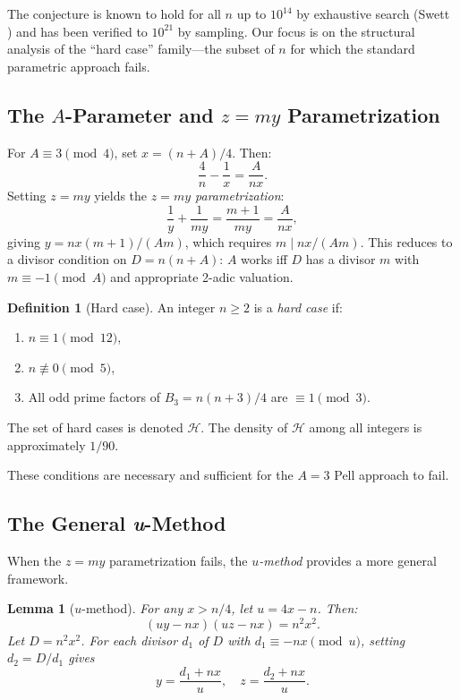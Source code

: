 \documentclass[11pt,a4paper]{article}
\theoremstyle{plain}
\newtheorem{lemma}[theorem]{Lemma}
\theoremstyle{definition}
\newtheorem{definition}[theorem]{Definition}
\newcommand{\Hard}{\mathcal{H}}
\begin{document}
The conjecture is known to hold for all $n$ up to $10^{14}$ by exhaustive search (Swett \cite{swett2006}) and has been verified to $10^{21}$ by sampling. Our focus is on the structural analysis of the ``hard case'' family---the subset of $n$ for which the standard parametric approach fails.

\subsection{The $A$-Parameter and $z = my$ Parametrization}

For $A \equiv 3 \pmod{4}$, set $x = (n+A)/4$. Then:
\[
\frac{4}{n} - \frac{1}{x} = \frac{A}{nx}.
\]
Setting $z = my$ yields the \emph{$z = my$ parametrization}:
\[
\frac{1}{y} + \frac{1}{my} = \frac{m+1}{my} = \frac{A}{nx},
\]
giving $y = nx(m+1)/(Am)$, which requires $m \mid nx/(Am)$. This reduces to a divisor condition on $D = n(n+A)$: $A$ works iff $D$ has a divisor $m$ with $m \equiv -1 \pmod{A}$ and appropriate 2-adic valuation.

\begin{definition}[Hard case]
\label{def:hard}
An integer $n \geq 2$ is a \emph{hard case} if:
\begin{enumerate}[label=(\roman*)]
\item $n \equiv 1 \pmod{12}$,
\item $n \not\equiv 0 \pmod{5}$,
\item All odd prime factors of $B_3 = n(n+3)/4$ are $\equiv 1 \pmod{3}$.
\end{enumerate}
The set of hard cases is denoted $\Hard$. The density of $\Hard$ among all integers is approximately $1/90$.
\end{definition}

These conditions are necessary and sufficient for the $A = 3$ Pell approach to fail.

\subsection{The General \emph{u}-Method}

When the $z = my$ parametrization fails, the \emph{$u$-method} provides a more general framework.

\begin{lemma}[$u$-method]
\label{lem:umethod}
For any $x > n/4$, let $u = 4x - n$. Then:
\[
(uy - nx)(uz - nx) = n^2 x^2.
\]
Let $D = n^2 x^2$. For each divisor $d_1$ of $D$ with $d_1 \equiv -nx \pmod{u}$, setting $d_2 = D/d_1$ gives
\[
y = \frac{d_1 + nx}{u}, \quad z = \frac{d_2 + nx}{u}.
\]
\end{lemma}
\end{document}
